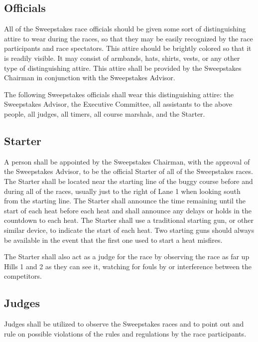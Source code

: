 \subsection{Officials}

	All of the Sweepstakes race officials should be given some sort of distinguishing attire to wear during the races, so that they may be easily recognized by the race participants and race spectators. This attire should be brightly colored so that it is readily visible. It may consist of armbands, hats, shirts, vests, or any other type of distinguishing attire. This attire shall be provided by the Sweepstakes Chairman in conjunction with the Sweepstakes Advisor.

	The following Sweepstakes officials shall wear this distinguishing attire: the Sweepstakes Advisor, the Executive Committee, all assistants to the above people, all judges, all timers, all course marshals, and the Starter.

\subsection{Starter}

	A person shall be appointed by the Sweepstakes Chairman, with the approval of the Sweepstakes Advisor, to be the official Starter of all of the Sweepstakes races. The Starter shall be located near the starting line of the buggy course before and during all of the races, usually just to the right of Lane 1 when looking south from the starting line. The Starter shall announce the time remaining until the start of each heat before each heat and shall announce any delays or holds in the countdown to each heat. The Starter shall use a traditional starting gun, or other similar device, to indicate the start of each heat. Two starting guns should always be available in the event that the first one used to start a heat misfires.

	The Starter shall also act as a judge for the race by observing the race as far up Hills 1 and 2 as they can see it, watching for fouls by or interference between the competitors.

\subsection{Judges}

	Judges shall be utilized to observe the Sweepstakes races and to point out and rule on possible violations of the rules and regulations by the race participants.

